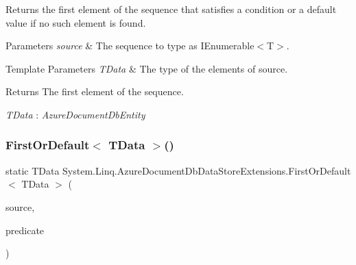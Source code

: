 Returns the first element of the sequence that satisfies a condition or a default value if no such element is found. 


\begin{DoxyParams}{Parameters}
{\em source} & The sequence to type as I\+Enumerable$<$\+T$>$.\\
\hline
\end{DoxyParams}

\begin{DoxyTemplParams}{Template Parameters}
{\em T\+Data} & The type of the elements of source.\\
\hline
\end{DoxyTemplParams}
\begin{DoxyReturn}{Returns}
The first element of the sequence.
\end{DoxyReturn}
\begin{Desc}
\item[Type Constraints]\begin{description}
\item[{\em T\+Data} : {\em Azure\+Document\+Db\+Entity}]\end{description}
\end{Desc}
\mbox{\label{classSystem_1_1Linq_1_1AzureDocumentDbDataStoreExtensions_ae3870009eab2cb1bf22b447d9fa51ec8_ae3870009eab2cb1bf22b447d9fa51ec8}} 
\subsubsection{\texorpdfstring{First\+Or\+Default$<$ T\+Data $>$()}{FirstOrDefault< TData >()}\hspace{0.1cm}{\footnotesize\ttfamily [2/2]}}
{\footnotesize\ttfamily static T\+Data System.\+Linq.\+Azure\+Document\+Db\+Data\+Store\+Extensions.\+First\+Or\+Default$<$ T\+Data $>$ (\begin{DoxyParamCaption}\item[{this \hyperlink{classCqrs_1_1Azure_1_1DocumentDb_1_1DataStores_1_1AzureDocumentDbDataStore}{Azure\+Document\+Db\+Data\+Store}$<$ T\+Data $>$}]{source,  }\item[{Func$<$ T\+Data, bool $>$}]{predicate }\end{DoxyParamCaption})\hspace{0.3cm}{\ttfamily [static]}}



